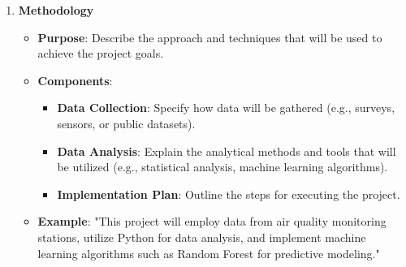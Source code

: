 \documentclass[aspectratio=169]{beamer}
\begin{document}
\begin{frame}[fragile]
\begin{enumerate}
        \item \textbf{Methodology}
            \begin{itemize}
                \item \textbf{Purpose}: Describe the approach and techniques that will be used to achieve the project goals.
                \item \textbf{Components}:
                    \begin{itemize}
                        \item \textbf{Data Collection}: Specify how data will be gathered (e.g., surveys, sensors, or public datasets).
                        \item \textbf{Data Analysis}: Explain the analytical methods and tools that will be utilized (e.g., statistical analysis, machine learning algorithms).
                        \item \textbf{Implementation Plan}: Outline the steps for executing the project.
                    \end{itemize}
                \item \textbf{Example}: "This project will employ data from air quality monitoring stations, utilize Python for data analysis, and implement machine learning algorithms such as Random Forest for predictive modeling."
            \end{itemize}
    \end{enumerate}
\end{frame}
\end{document}
